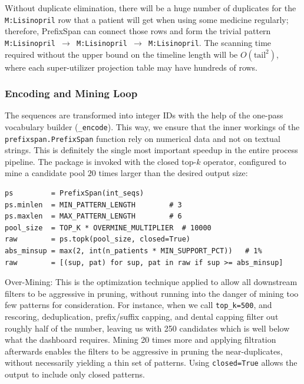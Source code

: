 \noindent Without duplicate elimination, there will be a huge number of duplicates for the \texttt{M:Lisinopril} row that a patient will get when using some medicine regularly; therefore, PrefixSpan can connect those rows and form the trivial pattern \texttt{M:Lisinopril \(\rightarrow\) M:Lisinopril \(\rightarrow\) M:Lisinopril}. The scanning time required without the upper bound on the timeline length will be \(O(\text{tail}^2)\), where each super-utilizer projection table may have hundreds of rows.

\subsubsection*{Encoding and Mining Loop}

The sequences are transformed into integer IDs with the help of the one-pass vocabulary builder (\texttt{\_encode}). This way, we ensure that the inner workings of the \texttt{prefixspan.PrefixSpan} function rely on numerical data and not on textual strings. This is definitely the single most important speedup in the entire process pipeline. The package is invoked with the closed top-\(k\) operator, configured to mine a candidate pool \(20\) times larger than the desired output size:

\begin{lstlisting}[style=pythonstyle]
ps         = PrefixSpan(int_seqs)
ps.minlen  = MIN_PATTERN_LENGTH        # 3
ps.maxlen  = MAX_PATTERN_LENGTH        # 6
pool_size  = TOP_K * OVERMINE_MULTIPLIER  # 10000
raw        = ps.topk(pool_size, closed=True)
abs_minsup = max(2, int(n_patients * MIN_SUPPORT_PCT))   # 1%
raw        = [(sup, pat) for sup, pat in raw if sup >= abs_minsup]

\end{lstlisting}

\noindent Over-Mining: This is the optimization technique applied to allow all downstream filters to be aggressive in pruning, without running into the danger of mining too few patterns for consideration. For instance, when we call \texttt{top\_k=500}, and rescoring, deduplication, prefix/suffix capping, and dental capping filter out roughly half of the number, leaving us with 250 candidates which is well below what the dashboard requires. Mining 20 times more and applying filtration afterwards enables the filters to be aggressive in pruning the near-duplicates, without necessarily yielding a thin set of patterns. Using \texttt{closed=True} allows the output to include only closed patterns.

